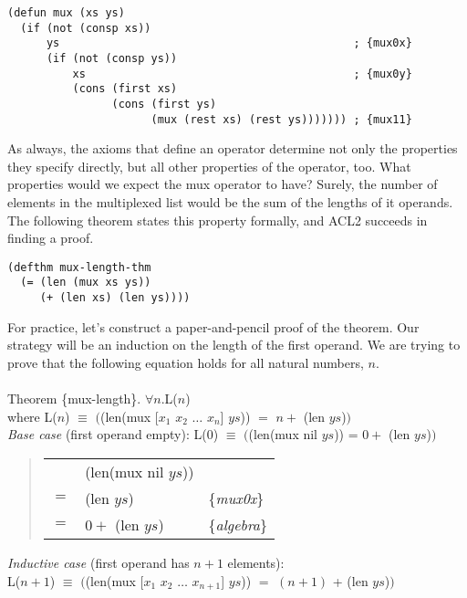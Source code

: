 \label{mux-defun}
\begin{Verbatim}
(defun mux (xs ys)
  (if (not (consp xs))
      ys                                             ; {mux0x}
      (if (not (consp ys))
          xs                                         ; {mux0y}
          (cons (first xs)
                (cons (first ys)
                      (mux (rest xs) (rest ys))))))) ; {mux11}
\end{Verbatim}

As always, the axioms that define an operator
determine not only the properties they specify directly,
but all other properties of the operator, too.
What properties would we expect the \textsf{mux} operator to have?
Surely, the number of elements in the multiplexed list
would be the sum of the lengths of it operands.
The following theorem states this property formally,
and ACL2 succeeds in finding a proof.

\label{mux-length-thm}
\begin{Verbatim}
(defthm mux-length-thm
  (= (len (mux xs ys))
     (+ (len xs) (len ys))))
\end{Verbatim}

For practice, let's construct a paper-and-pencil proof of the theorem.
Our strategy will be an induction on the length of the first operand.
We are trying to prove that the following equation holds for all natural numbers, $n$.\\
~\\
Theorem \{mux-length\}. $\forall n.$L($n$)\\
where L($n$) $\equiv$ $($\textsf{(len(mux [$x_1$ $x_2$ $\dots$ $x_n$] $ys$)) $=$ $n +$ (len $ys$)}$)$\\[1mm]
\emph{Base case} (first operand empty): L($0$) $\equiv$ $($\textsf{(len(mux nil $ys$)) = $0 +$ (len $ys$)}$)$
~\\[-1.0em]
\begin{quote}
\begin{tabular}{lll}
     & \textsf{(len(mux nil $ys$)})    &                   \\
 $=$ & \textsf{(len $ys$)}             & \{\emph{mux0x}\}  \\
 $=$ & \textsf{$0 +$ (len $ys$)}       & \{\emph{algebra}\}\\
\end{tabular}
\end{quote}
\label{mux-length-thm-induc-case}\emph{Inductive case} (first operand has $n+1$ elements):\\
L($n+1$) $\equiv$ $($\textsf{(len(mux [$x_1$ $x_2$ $\dots$ $x_{n+1}$] $ys$)) $=$ $(n+1)$ + (len $ys$)}$)$


